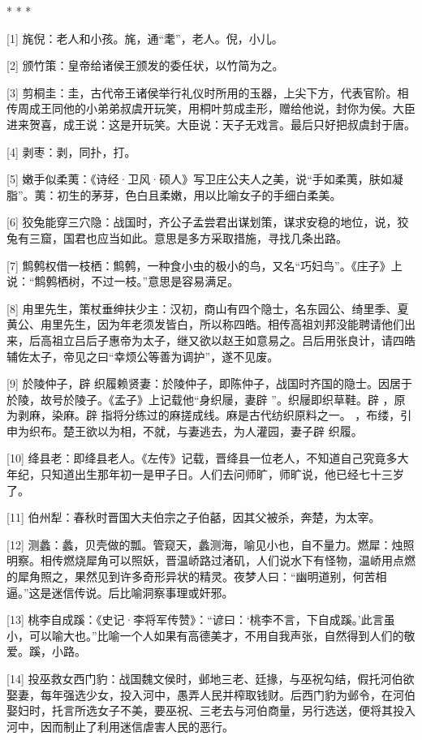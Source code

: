 \documentclass[12pt,UTF8]{ctexbook}
\begin{document}
* * *



[1] 旄倪：老人和小孩。旄，通“耄”，老人。倪，小儿。

[2] 颁竹策：皇帝给诸侯王颁发的委任状，以竹简为之。

[3] 剪桐圭：圭，古代帝王诸侯举行礼仪时所用的玉器，上尖下方，代表官阶。相传周成王同他的小弟弟叔虞开玩笑，用桐叶剪成圭形，赠给他说，封你为侯。大臣进来贺喜，成王说：这是开玩笑。大臣说：天子无戏言。最后只好把叔虞封于唐。

[4] 剥枣：剥，同扑，打。

[5] 嫩手似柔荑：《诗经·卫风·硕人》写卫庄公夫人之美，说“手如柔荑，肤如凝脂”。荑：初生的茅芽，色白且柔嫩，用以比喻女子的手细白柔美。

[6] 狡兔能穿三穴隐：战国时，齐公子孟尝君出谋划策，谋求安稳的地位，说，狡兔有三窟，国君也应当如此。意思是多方采取措施，寻找几条出路。

[7] 鹪鹩权借一枝栖：鹪鹩，一种食小虫的极小的鸟，又名“巧妇鸟”。《庄子》上说：“鹪鹩栖树，不过一枝。”意思是容易满足。

[8] 甪里先生，策杖垂绅扶少主：汉初，商山有四个隐士，名东园公、绮里季、夏黄公、甪里先生，因为年老须发皆白，所以称四皓。相传高祖刘邦没能聘请他们出来，后高祖立吕后子惠帝为太子，继又欲以赵王如意易之。吕后用张良计，请四皓辅佐太子，帝见之曰“幸烦公等善为调护”，遂不见废。

[9] 於陵仲子，辟 织履赖贤妻：於陵仲子，即陈仲子，战国时齐国的隐士。因居于於陵，故号於陵子。《孟子》上记载他“身织屦，妻辟 ”。织屦即织草鞋。辟 ，原为剥麻，染麻。辟 指将分练过的麻搓成线。麻是古代纺织原料之一。 ，布缕，引申为织布。楚王欲以为相，不就，与妻逃去，为人灌园，妻子辟 织履。

[10] 绛县老：即绛县老人。《左传》记载，晋绛县一位老人，不知道自己究竟多大年纪，只知道出生那年初一是甲子日。人们去问师旷，师旷说，他已经七十三岁了。

[11] 伯州犁：春秋时晋国大夫伯宗之子伯嚭，因其父被杀，奔楚，为太宰。

[12] 测蠡：蠡，贝壳做的瓢。管窥天，蠡测海，喻见小也，自不量力。燃犀：烛照明察。相传燃烧犀角可以照妖，晋温峤路过渚矶，人们说水下有怪物，温峤用点燃的犀角照之，果然见到许多奇形异状的精灵。夜梦人曰：“幽明道别，何苦相逼。”这是迷信传说。后比喻洞察事理或奸邪。

[13] 桃李自成蹊：《史记·李将军传赞》：“谚曰：‘桃李不言，下自成蹊。’此言虽小，可以喻大也。”比喻一个人如果有高德美才，不用自我声张，自然得到人们的敬爱。蹊，小路。

[14] 投巫救女西门豹：战国魏文侯时，邺地三老、廷掾，与巫祝勾结，假托河伯欲娶妻，每年强选少女，投入河中，愚弄人民并榨取钱财。后西门豹为邺令，在河伯娶妇时，托言所选女子不美，要巫祝、三老去与河伯商量，另行选送，便将其投入河中，因而制止了利用迷信虐害人民的恶行。
\end{document}
